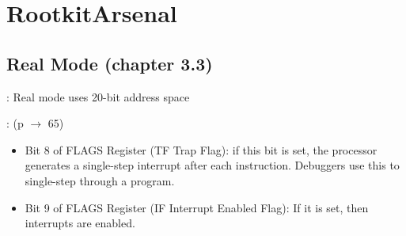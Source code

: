 

\chapter{RootkitArsenal}
\section{Real Mode (chapter 3.3)}
: Real mode uses 20-bit address space
\begin{note}

\end{note}

\begin{note}: (p $\rightarrow$ 65)\\


\begin{itemize}
\item Bit 8 of FLAGS Register (TF Trap Flag): if this bit is set, the processor generates a single-step interrupt after each instruction. Debuggers use this to single-step through a program.
\item Bit 9 of FLAGS Register (IF Interrupt Enabled Flag): If it is set, then interrupts are enabled.
\end{itemize}
\end{note}

